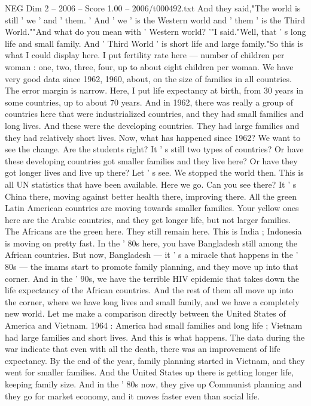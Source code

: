 \begin{textsample}{NEG Dim 2 – 2006 – Score 1.00 – 2006/t000492.txt}
And they said,"The world is still ' we ' and ' them. ' And ' we ' is the Western world and ' them ' is the Third World.""And what do you mean with ' Western world? '"I said."Well, that ' s long life and small family.
And ' Third World ' is short life and large family."So this is what I could display here.
I put fertility rate here — number of children per woman : one, two, three, four, up to about eight children per woman.
We have very good data since 1962, 1960, about, on the size of families in all countries.
The error margin is narrow.
Here, I put life expectancy at birth, from 30 years in some countries, up to about 70 years.
And in 1962, there was really a group of countries here that were industrialized countries, and they had small families and long lives.
And these were the developing countries.
They had large families and they had relatively short lives.
Now, what has happened since 1962?
We want to see the change.
Are the students right?
It ' s still two types of countries?
Or have these developing countries got smaller families and they live here?
Or have they got longer lives and live up there?
Let ' s see.
We stopped the world then.
This is all UN statistics that have been available.
Here we go.
Can you see there?
It ' s China there, moving against better health there, improving there.
All the green Latin American countries are moving towards smaller families.
Your yellow ones here are the Arabic countries, and they get longer life, but not larger families.
The Africans are the green here.
They still remain here.
This is India ; Indonesia is moving on pretty fast.
In the ' 80s here, you have Bangladesh still among the African countries.
But now, Bangladesh — it ' s a miracle that happens in the ' 80s — the imams start to promote family planning, and they move up into that corner.
And in the ' 90s, we have the terrible HIV epidemic that takes down the life expectancy of the African countries.
And the rest of them all move up into the corner, where we have long lives and small family, and we have a completely new world.
Let me make a comparison directly between the United States of America and Vietnam. 1964 : America had small families and long life ; Vietnam had large families and short lives.
And this is what happens.
The data during the war indicate that even with all the death, there was an improvement of life expectancy.
By the end of the year, family planning started in Vietnam, and they went for smaller families.
And the United States up there is getting longer life, keeping family size.
And in the ' 80s now, they give up Communist planning and they go for market economy, and it moves faster even than social life.

\end{textsample}
